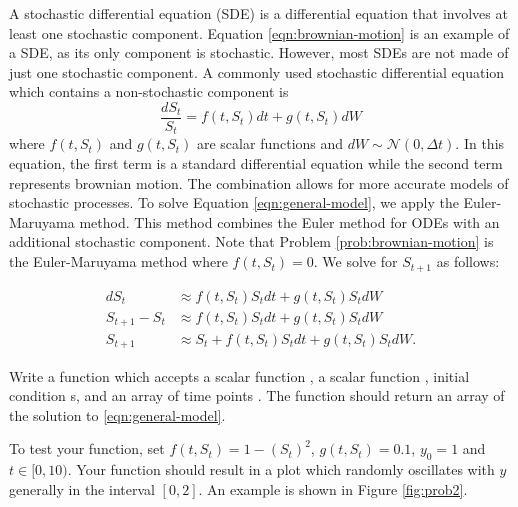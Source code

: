 A stochastic differential equation (SDE) is a differential equation that involves at least one stochastic component.
Equation \ref{eqn:brownian-motion} is an example of a SDE, as its only component is stochastic.
However, most SDEs are not made of just one stochastic component.
A commonly used stochastic differential equation which contains a non-stochastic component is
\begin{equation}
\frac{dS_t}{S_t}=f(t,S_t)dt + g(t,S_t)dW
\label{eqn:general-model}
\end{equation}
where $f(t,S_t)$ and $g(t,S_t)$ are scalar functions and $dW\sim\mathscr{N}(0,\Delta t)$.
In this equation, the first term is a standard differential equation while the second term represents brownian motion.
The combination allows for more accurate models of stochastic processes.
To solve Equation \ref{eqn:general-model}, we apply the Euler-Maruyama method.
This method combines the Euler method for ODEs with an additional stochastic component.
Note that Problem \ref{prob:brownian-motion} is the Euler-Maruyama method where $f(t,S_t)=0$.
We solve for $S_{t+1}$ as follows:

\begin{align*}
dS_t&\approx f(t,S_t)S_tdt + g(t,S_t)S_tdW\\
S_{t+1}-S_t&\approx f(t,S_t)S_tdt + g(t,S_t)S_tdW\\
S_{t+1}&\approx S_t+f(t,S_t)S_tdt + g(t,S_t)S_tdW.
\end{align*}

\begin{problem}
Write a function  which accepts a scalar function , a scalar function , initial condition s, and an array of time points .
The function should return an array of the solution to \ref{eqn:general-model}.

To test your function, set $f(t,S_t)=1-(S_t)^2$, $g(t,S_t)=0.1$, $y_0=1$ and $t\in[0,10)$.
Your function should result in a plot which randomly oscillates with $y$ generally in the interval $[0,2]$.
An example is shown in Figure \ref{fig:prob2}.
\label{prob:euler-maruyama}
\end{problem}

